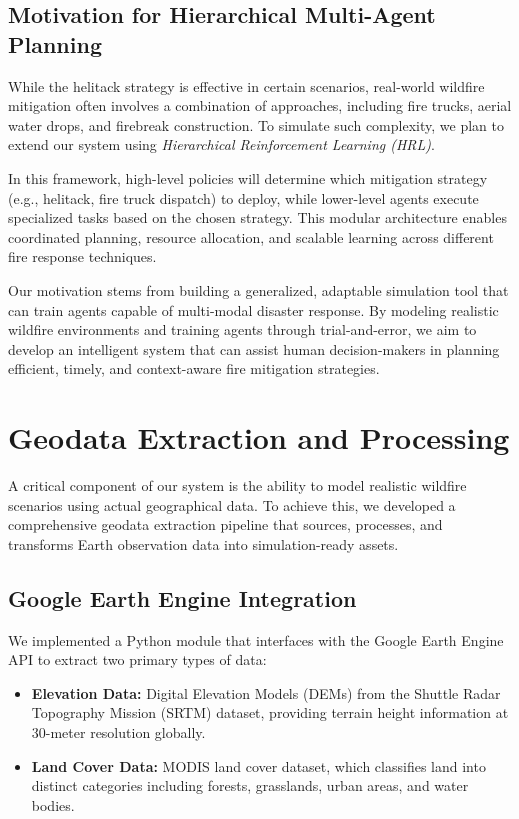 \documentclass[conference]{IEEEtran}
\begin{document}
\subsection{Motivation for Hierarchical Multi-Agent Planning}
While the helitack strategy is effective in certain scenarios, real-world wildfire mitigation often involves a combination of approaches, including fire trucks, aerial water drops, and firebreak construction. To simulate such complexity, we plan to extend our system using \textit{Hierarchical Reinforcement Learning (HRL)}.

\noindent
In this framework, high-level policies will determine which mitigation strategy (e.g., helitack, fire truck dispatch) to deploy, while lower-level agents execute specialized tasks based on the chosen strategy. This modular architecture enables coordinated planning, resource allocation, and scalable learning across different fire response techniques.

\noindent
Our motivation stems from building a generalized, adaptable simulation tool that can train agents capable of multi-modal disaster response. By modeling realistic wildfire environments and training agents through trial-and-error, we aim to develop an intelligent system that can assist human decision-makers in planning efficient, timely, and context-aware fire mitigation strategies.

\section{Geodata Extraction and Processing}

A critical component of our system is the ability to model realistic wildfire scenarios using actual geographical data. To achieve this, we developed a comprehensive geodata extraction pipeline that sources, processes, and transforms Earth observation data into simulation-ready assets.

\subsection{Google Earth Engine Integration}
We implemented a Python module that interfaces with the Google Earth Engine API to extract two primary types of data:

\begin{itemize}
    \item \textbf{Elevation Data:} Digital Elevation Models (DEMs) from the Shuttle Radar Topography Mission (SRTM) dataset, providing terrain height information at 30-meter resolution globally.
    \item \textbf{Land Cover Data:} MODIS land cover dataset, which classifies land into distinct categories including forests, grasslands, urban areas, and water bodies.
\end{itemize}
\end{document}
